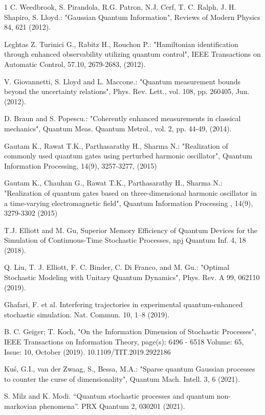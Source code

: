 \documentclass[journal,twocolumn]{IEEEtran}
\begin{document}
\begin{thebibliography}{1}
C. Weedbrook, S. Pirandola, R.G. Patron, N.J. Cerf, T. C. Ralph, J. H. Shapiro, S. Lloyd.: "Gaussian Quantum Information", Reviews of Modern Physics 84, 621 (2012).

Leghtas Z. Turinici G., Rabitz H., Rouchon P.: "Hamiltonian identification through enhanced observability utilizing quantum control", IEEE Transactions on Automatic Control, 57.10, 2679-2683, (2012).

V. Giovannetti, S. Lloyd and L. Maccone.: "Quantum measurement bounds beyond the uncertainty relations", Phys. Rev. Lett., vol. 108, pp. 260405, Jun. (2012).

D. Braun and S. Popescu.: "Coherently enhanced measurements in classical mechanics", Quantum Meas. Quantum Metrol., vol. 2, pp. 44-49, (2014).

Gautam K., Rawat T.K., Parthasarathy H., Sharma N.: "Realization of commonly used quantum gates using perturbed harmonic oscillator", Quantum Information Processing, 14(9), 3257-3277, (2015)

Gautam K., Chauhan G., Rawat T.K., Parthasarathy H., Sharma N.: "Realization of quantum gates based on three-dimensional harmonic oscillator in a time-varying electromagnetic field", Quantum Information Processing , 14(9), 3279-3302 (2015)

T.J. Elliott and M. Gu, Superior Memory Efficiency of Quantum Devices for the Simulation of Continuous-Time Stochastic Processes, npj Quantum Inf. 4, 18 (2018).

Q. Liu, T. J. Elliott, F. C. Binder, C. Di Franco, and M. Gu.: "Optimal Stochastic Modeling with Unitary Quantum Dynamics", Phys. Rev. A 99, 062110 (2019).

Ghafari, F. et al. Interfering trajectories in experimental quantum-enhanced stochastic simulation. Nat. Commun. 10, 1–8 (2019).

B. C. Geiger; T. Koch, "On the Information Dimension of Stochastic Processes", IEEE Transactions on Information Theory, page(s): 6496 - 6518 Volume: 65, Issue: 10, October (2019). 10.1109/TIT.2019.2922186

Kuś, G.I., van der Zwaag, S., Bessa, M.A.: "Sparse quantum Gaussian processes to counter the curse of dimensionality", Quantum Mach. Intell. 3, 6 (2021).

S. Milz and K. Modi. “Quantum stochastic processes and quantum non-markovian phenomena”. PRX Quantum 2, 030201 (2021).


\end{thebibliography}
\end{document}
